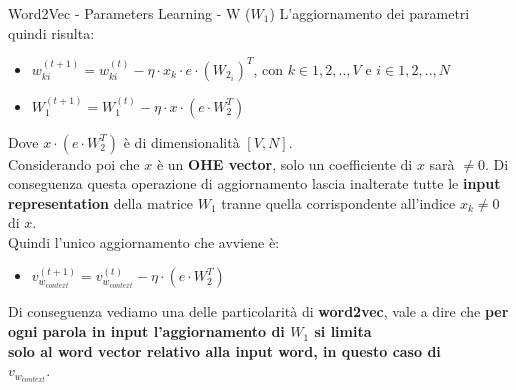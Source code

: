 \documentclass[british]{beamer}
\begin{document}
\begin{frame}{Word2Vec - Parameters Learning - W (\(W_1\))}
	L'aggiornamento dei parametri quindi risulta:
	\begin{itemize}
		\item \( w_{ki}^{(t+1)} = w_{ki}^{(t)} - \eta\cdot x_k \cdot e \cdot (W_{2_{i}})^T\), con \(k \in {1,2,..,V}\) e \(i \in {1,2,..,N}\)
		\item \( W_{1}^{(t+1)} = W_{1}^{(t)} - \eta\cdot x \cdot \left( e \cdot W_{2}^T \right) \)
	\end{itemize}
	Dove \(x \cdot \left( e \cdot W_2^T\right)\) \`{e} di dimensionalit\`{a} \([V,N]\).\\
	Considerando poi che \(x\) \`{e} un \textbf{OHE vector}, solo un coefficiente di \(x\) sar\`{a} \(\neq 0\).
	Di conseguenza questa operazione di aggiornamento lascia inalterate tutte le \textbf{input representation} della matrice \textbf{\(W_1\)} tranne quella corrispondente all'indice \(x_k \neq0\) di \(x\). \\
	Quindi l'unico aggiornamento che avviene \`{e}:
	\begin{itemize}
		\item \( v_{w_{context}}^{(t+1)} = v_{w_{context}}^{(t)} - \eta\cdot \left(e \cdot W_{2}^T\right)\)
	\end{itemize}
	Di conseguenza vediamo una delle particolarit\`{a} di \textbf{word2vec}, vale a dire che \textbf{per ogni parola in input l'aggiornamento di \(W_1\) si limita \\solo al word vector relativo alla input word, in questo caso di\\ \(v_{w_{context}}\)}. 
\end{frame}
\end{document}
